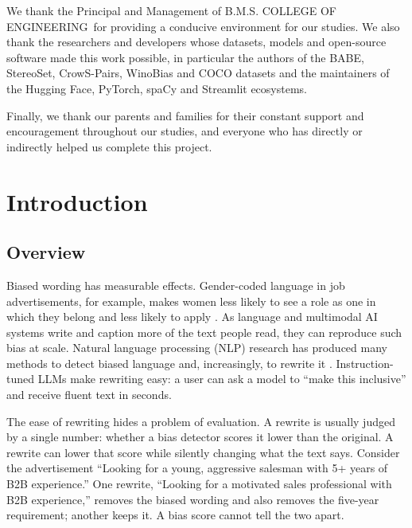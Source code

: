 \documentclass[12pt,a4paper,oneside]{report}
\newcommand{\College}{B.M.S. COLLEGE OF ENGINEERING}
\begin{document}
We thank the Principal and Management of \College\ for providing a conducive environment for our studies. We also thank
the researchers and developers whose datasets, models and open-source software made this work possible, in particular
the authors of the BABE, StereoSet, CrowS-Pairs, WinoBias and COCO datasets and the maintainers of the Hugging Face,
PyTorch, spaCy and Streamlit ecosystems.

Finally, we thank our parents and families for their constant support and encouragement throughout our studies, and
everyone who has directly or indirectly helped us complete this project.

\tableofcontents
\listoffigures
\listoftables

\clearpage
{}

\chapter{Introduction}

\section{Overview}
Biased wording has measurable effects. Gender-coded language in job advertisements, for example, makes women less
likely to see a role as one in which they belong and less likely to apply \cite{gaucher}. As language and multimodal AI
systems write and caption more of the text people read, they can reproduce such bias at scale. Natural language
processing (NLP) research has produced many methods to detect biased language and, increasingly, to rewrite it
\cite{blodgett2020,gallegos}. Instruction-tuned LLMs make rewriting easy: a user can ask a model to ``make this
inclusive'' and receive fluent text in seconds.

The ease of rewriting hides a problem of evaluation. A rewrite is usually judged by a single number: whether a bias
detector scores it lower than the original. A rewrite can lower that score while silently changing what the text says.
Consider the advertisement ``Looking for a young, aggressive salesman with 5+ years of B2B experience.'' One rewrite,
``Looking for a motivated sales professional with B2B experience,'' removes the biased wording and also removes the
five-year requirement; another keeps it. A bias score cannot tell the two apart.
\end{document}

